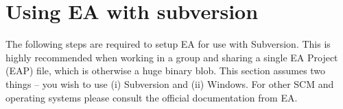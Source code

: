 \newpage

\section{Using EA with subversion}
\genHeader

The following steps are required to setup EA for use with Subversion. This is
highly recommended when working in a group and sharing a single EA Project (EAP) file, which is otherwise a huge binary blob. This section assumes two things -- you wish to use (i) Subversion and (ii) Windows. For other SCM
and operating systems please consult the official documentation from EA.








